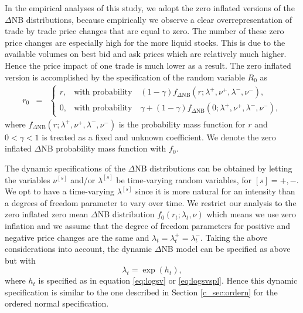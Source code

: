 \documentclass[12pt]{article}
\begin{document}
In the empirical analyses of this study,
we adopt the zero inflated versions of the $\Delta$NB distributions,
because empirically we observe a clear overrepresentation of
trade by trade price changes that are equal to zero.
The number of these zero price changes are especially high for the more
liquid stocks. This is due to the available volumes on best bid and ask prices
which are relatively much higher. Hence the price impact of one trade is much
lower as a result. The zero inflated version is accomplished by the specification
of the random variable $R_{0}$ as
\begin{eqnarray*}
r_{0} &=& \begin{cases} r, & \text{with probability} \quad (1-\gamma)f_{\Delta\text{NB}}(r; \lambda^{+}, \nu^{+} ,\lambda^{-}, \nu^{-}), \\
0, & \text{with probability} \quad  \gamma + (1-\gamma)  f_{\Delta\text{NB}}(0; \lambda^{+}, \nu^{+} ,\lambda^{-}, \nu^{-}), \end{cases}
\end{eqnarray*}
where $f_{\Delta\text{NB}}(r; \lambda^{+}, \nu^{+} ,\lambda^{-}, \nu^{-})$
is the probability mass function for $r$
and $0<\gamma<1$ is treated as a fixed and unknown coefficient. We denote the zero inflated $\Delta$NB probability mass function with $f_0$.


The dynamic specifications of the $\Delta$NB distributions can be obtained
by letting the variables $\nu ^{[s]}$ and/or $\lambda ^{[s]}$ be time-varying
random variables, for $[s]=+,-$.
We opt to have a time-varying $\lambda ^{[s]}$ 
since it is more natural for an intensity than a degrees of freedom parameter to
vary over time.  We restrict our analysis to the  zero inflated zero mean $\Delta$NB distribution $f_{0}(r_{t}; \lambda_t,  \nu)$ which means we use zero inflation and we assume that the degree of freedom parameters for positive and negative price changes are the same and $\lambda_t=\lambda ^{+}_t=\lambda ^{-}_t$. 
Taking the above considerations into account, the dynamic $\Delta$NB model
can be specified as above but with
\[
\lambda_t = \exp(h_t),
\]
where $h_t$ is specified as in equation \eqref{eq:logsv} or \eqref{eq:logsvspl}.
Hence this dynamic specification is similar to the one
described in Section \ref{c_sec:ordern} for the ordered normal specification.
%
\end{document}
